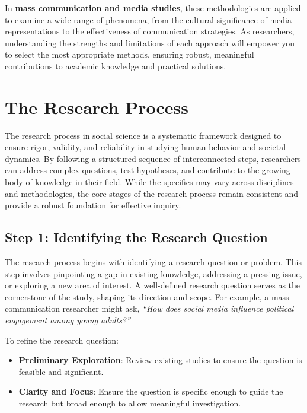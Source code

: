 \documentclass[
]{book}
\providecommand{\tightlist}{%
  \setlength{\itemsep}{0pt}\setlength{\parskip}{0pt}}
\begin{document}
In \textbf{mass communication and media studies}, these methodologies are applied to examine a wide range of phenomena, from the cultural significance of media representations to the effectiveness of communication strategies. As researchers, understanding the strengths and limitations of each approach will empower you to select the most appropriate methods, ensuring robust, meaningful contributions to academic knowledge and practical solutions.

\section{The Research Process}\label{the-research-process}

The research process in social science is a systematic framework designed to ensure rigor, validity, and reliability in studying human behavior and societal dynamics. By following a structured sequence of interconnected steps, researchers can address complex questions, test hypotheses, and contribute to the growing body of knowledge in their field. While the specifics may vary across disciplines and methodologies, the core stages of the research process remain consistent and provide a robust foundation for effective inquiry.

\subsection*{Step 1: Identifying the Research Question}\label{step-1-identifying-the-research-question}

The research process begins with identifying a research question or problem. This step involves pinpointing a gap in existing knowledge, addressing a pressing issue, or exploring a new area of interest. A well-defined research question serves as the cornerstone of the study, shaping its direction and scope. For example, a mass communication researcher might ask, \emph{``How does social media influence political engagement among young adults?''}

To refine the research question:

\begin{itemize}
\tightlist
\item
  \textbf{Preliminary Exploration}: Review existing studies to ensure the question is feasible and significant.
\item
  \textbf{Clarity and Focus}: Ensure the question is specific enough to guide the research but broad enough to allow meaningful investigation.
\end{itemize}
\end{document}
